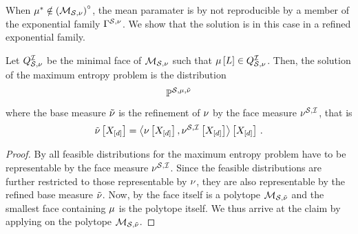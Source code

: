 When $\mu^*\notin{\left(\mathcal{M}_{\mathcal{S},\nu}\right)}^{\circ}$, the mean paramater is by  not reproducible by a member of the exponential family $\Gamma^{\mathcal{S},\nu}$.
We show that the solution is in this case in a refined exponential family.

\begin{theorem}
    \label{the:maxEntropyFace}
    Let $Q^{\mathcal{I}}_{\mathcal{S},\nu}$ be the minimal face of $\mathcal{M}_{\mathcal{S},\nu}$ such that $\mu\left[L\right]\in Q^{\mathcal{I}}_{\mathcal{S},\nu}$.
    Then, the solution of the maximum entropy problem is the distribution
    \begin{align*}
        \mathbb{P}^{\mathcal{S},\mu,\tilde{\nu}}
    \end{align*}
    where the base measure $\tilde{\nu}$ is the refinement of $\nu$ by the face measure $\nu^{\mathcal{S},\mathcal{I}}$, that is
    \begin{align*}
        \tilde{\nu}\left[X_{[d]}\right] = \left\langle \nu\left[X_{[d]}\right],\nu^{\mathcal{S},\mathcal{I}}\left[X_{[d]}\right]\right\rangle \left[ X_{[d]} \right] \, .
    \end{align*}
\end{theorem}
\begin{proof}
    By  all feasible distributions for the maximum entropy problem have to be representable by the face measure $\nu^{\mathcal{S},\mathcal{I}}$.
    Since the feasible distributions are further restricted to those representable by $\nu$, they are also representable by the refined base measure $\tilde{\nu}$.
    Now, by  the face itself is a polytope $\mathcal{M}_{\mathcal{S},\tilde{\nu}}$ and the smallest face containing $\mu$ is the polytope itself.
    We thus arrive at the claim by applying  on the polytope $\mathcal{M}_{\mathcal{S},\tilde{\nu}}$.
\end{proof}


